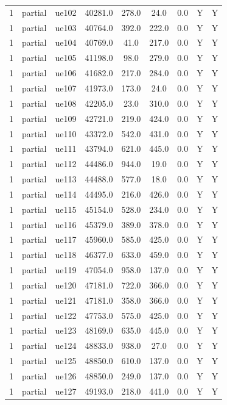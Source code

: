 \begin{table}[ht]
\begin{tabular}{|c|c|c|c|c|c|c|c|c|}
1 & partial & ue102 & 40281.0 & 278.0 & 24.0 & 0.0 & Y & Y \\
1 & partial & ue103 & 40764.0 & 392.0 & 222.0 & 0.0 & Y & Y \\
1 & partial & ue104 & 40769.0 & 41.0 & 217.0 & 0.0 & Y & Y \\
1 & partial & ue105 & 41198.0 & 98.0 & 279.0 & 0.0 & Y & Y \\
1 & partial & ue106 & 41682.0 & 217.0 & 284.0 & 0.0 & Y & Y \\
1 & partial & ue107 & 41973.0 & 173.0 & 24.0 & 0.0 & Y & Y \\
1 & partial & ue108 & 42205.0 & 23.0 & 310.0 & 0.0 & Y & Y \\
1 & partial & ue109 & 42721.0 & 219.0 & 424.0 & 0.0 & Y & Y \\
1 & partial & ue110 & 43372.0 & 542.0 & 431.0 & 0.0 & Y & Y \\
1 & partial & ue111 & 43794.0 & 621.0 & 445.0 & 0.0 & Y & Y \\
1 & partial & ue112 & 44486.0 & 944.0 & 19.0 & 0.0 & Y & Y \\
1 & partial & ue113 & 44488.0 & 577.0 & 18.0 & 0.0 & Y & Y \\
1 & partial & ue114 & 44495.0 & 216.0 & 426.0 & 0.0 & Y & Y \\
1 & partial & ue115 & 45154.0 & 528.0 & 234.0 & 0.0 & Y & Y \\
1 & partial & ue116 & 45379.0 & 389.0 & 378.0 & 0.0 & Y & Y \\
1 & partial & ue117 & 45960.0 & 585.0 & 425.0 & 0.0 & Y & Y \\
1 & partial & ue118 & 46377.0 & 633.0 & 459.0 & 0.0 & Y & Y \\
1 & partial & ue119 & 47054.0 & 958.0 & 137.0 & 0.0 & Y & Y \\
1 & partial & ue120 & 47181.0 & 722.0 & 366.0 & 0.0 & Y & Y \\
1 & partial & ue121 & 47181.0 & 358.0 & 366.0 & 0.0 & Y & Y \\
1 & partial & ue122 & 47753.0 & 575.0 & 425.0 & 0.0 & Y & Y \\
1 & partial & ue123 & 48169.0 & 635.0 & 445.0 & 0.0 & Y & Y \\
1 & partial & ue124 & 48833.0 & 938.0 & 27.0 & 0.0 & Y & Y \\
1 & partial & ue125 & 48850.0 & 610.0 & 137.0 & 0.0 & Y & Y \\
1 & partial & ue126 & 48850.0 & 249.0 & 137.0 & 0.0 & Y & Y \\
1 & partial & ue127 & 49193.0 & 218.0 & 441.0 & 0.0 & Y & Y \\

\end{tabular}
\end{table}
